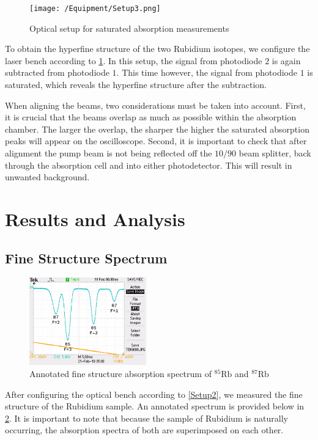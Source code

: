 \documentclass[12pt]{article}
\newcommand{\RbEF}{$^{85}\text{Rb}$ }
\newcommand{\RbES}{$^{87}\text{Rb}$ }
\begin{document}
	\pagebreak
	
	\begin{figure}
		\texttt{[image: /Equipment/Setup3.png]}
		\caption{Optical setup for saturated absorption measurements}
		\label{Setup3}
	\end{figure}
	
	
	To obtain the hyperfine structure of the two Rubidium isotopes, we configure the laser bench according to \cref{Setup3}. In this setup, the signal from photodiode $2$ is again subtracted from photodiode $1$. This time however, the signal from photodiode $1$ is saturated, which reveals the hyperfine structure after the subtraction.
	
	When aligning the beams, two considerations must be taken into account. First, it is crucial that the beams overlap as much as possible within the absorption chamber. The larger the overlap, the sharper the higher the saturated absorption peaks will appear on the oscilloscope. Second, it is important to check that after alignment the pump beam is not being reflected off the $10/90$ beam splitter, back through the absorption cell and into either photodetector. This will result in unwanted background.
	
	
	
	\section{Results and Analysis}
		
	\begin{multicols}{2}
	\subsection{Fine Structure Spectrum}
	
\begin{figure}[H]
	\centering
	\includegraphics[width=0.45\textwidth]{Fine_Structure/AnnotatedSpectrum.jpg}
	\caption{Annotated fine structure absorption spectrum of \RbEF and \RbES}
	\label{RubidiumFineStructure}		
\end{figure}

	\columnbreak
	
	After configuring the optical bench according to \cref{Setup2}, we measured the fine structure of the Rubidium sample. An annotated spectrum is provided below in \cref{RubidiumFineStructure}. It is important to note that because the sample of Rubidium is naturally occurring, the absorption spectra of both are superimposed on each other.
	
	\end{multicols}
	
\end{document}
